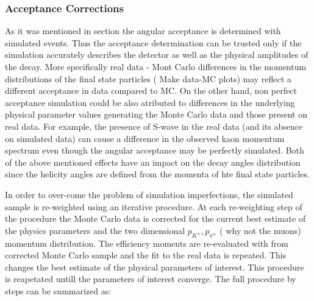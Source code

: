 \subsubsection{Acceptance Corrections}
\label{Accceptance_Corrections}
As it was mentioned in section  the angular acceptance is determined with simulated \BsJpsiKst events.
Thus the acceptance determination can be trusted only if the simulation accurately describes the detector as well as the 
physical amplitudes of the \BsJpsiKst decay. More specifically real data - Mont Carlo differences in the momentum distributions
of the final state particles (\figref{} {\color{red} Make data-MC plots}) may reflect a different acceptance in data compared to MC. On the other hand,
non perfect acceptance simulation could be also atributed to differences in the underlying physical parameter values generating 
the Monte Carlo data and those present on real data. For example, the presence of S-wave in the real data (and its absence on simulated data)
can cause a difference in the observed kaon momentum spectrum even though the angular acceptance may be perfectly simulated.
Both of the above mentioned effects have an impact on the decay angles distribution since the helicity angles are defined
from the momenta of hte final state particles. 

In order to over-come the problem of simulation imperfections, the simulated sample
is re-weighted using an iterative procedure. At each re-weighting step of the procedure the Monte Carlo data is corrected 
for the current best estimate of the physics parameters and the two dimensional $p_{K^{\pm}},p_{\pi^{\mp}}$ ({\color{red} why not the muons)} momentum distribution. 
The efficiency moments are re-evaluated with from corrected Monte Carlo sample and the fit to the real data is repeated. 
This changes the best estimate of the physical parameters of interest. This procedure is reapetated untill the parameters
of interest converge. The full procedure by steps can be summarized as:

